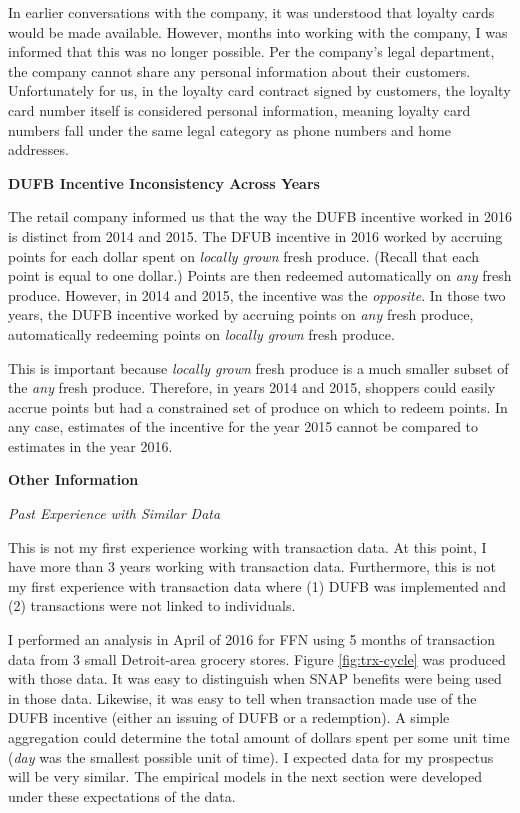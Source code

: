 \documentclass[12pt,letterpaperpaper,]{book}
\begin{document}
In earlier conversations with the company, it was understood that
loyalty cards would be made available. However, months into working with
the company, I was informed that this was no longer possible. Per the
company's legal department, the company cannot share any personal
information about their customers. Unfortunately for us, in the loyalty
card contract signed by customers, the loyalty card number itself is
considered personal information, meaning loyalty card numbers fall under
the same legal category as phone numbers and home addresses.

\textbf{DUFB Incentive Inconsistency Across Years}

The retail company informed us that the way the DUFB incentive worked in
2016 is distinct from 2014 and 2015. The DFUB incentive in 2016 worked
by accruing points for each dollar spent on \emph{locally grown} fresh
produce. (Recall that each point is equal to one dollar.) Points are
then redeemed automatically on \emph{any} fresh produce. However, in
2014 and 2015, the incentive was the \emph{opposite}. In those two
years, the DUFB incentive worked by accruing points on \emph{any} fresh
produce, automatically redeeming points on \emph{locally grown} fresh
produce.

This is important because \emph{locally grown} fresh produce is a much
smaller subset of the \emph{any} fresh produce. Therefore, in years 2014
and 2015, shoppers could easily accrue points but had a constrained set
of produce on which to redeem points. In any case, estimates of the
incentive for the year 2015 cannot be compared to estimates in the year
2016.

\textbf{Other Information}

\emph{Past Experience with Similar Data}

This is not my first experience working with transaction data. At this
point, I have more than 3 years working with transaction data.
Furthermore, this is not my first experience with transaction data where
(1) DUFB was implemented and (2) transactions were not linked to
individuals.

I performed an analysis in April of 2016 for FFN using 5 months of
transaction data from 3 small Detroit-area grocery stores. Figure
\ref{fig:trx-cycle} was produced with those data. It was easy to
distinguish when SNAP benefits were being used in those data. Likewise,
it was easy to tell when transaction made use of the DUFB incentive
(either an issuing of DUFB or a redemption). A simple aggregation could
determine the total amount of dollars spent per some unit time
(\emph{day} was the smallest possible unit of time). I expected data for
my prospectus will be very similar. The empirical models in the next
section were developed under these expectations of the data.
\end{document}
